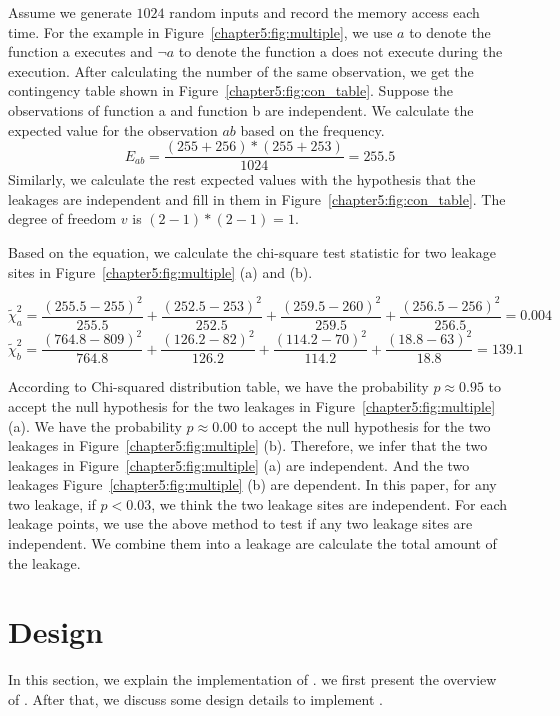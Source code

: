 Assume we generate $1024$ random inputs and record the memory access each time. For the example in Figure~\ref{chapter5:fig:multiple}, we use $a$ to denote the function \textsf{a} executes and $\lnot a$ to denote the function \textsf{a} does not execute during the execution. After calculating the number of the same observation, we get the contingency table shown in Figure~\ref{chapter5:fig:con_table}. Suppose the observations of function \textsf{a} and function \textsf{b} are independent. We calculate the expected value for the observation $ab$ based on the frequency.
\[ E_{ab} = \frac{(255+256)*(255+253)}{1024} = 255.5\]
Similarly, we calculate the rest expected values with the hypothesis that the leakages are independent and fill in them in Figure~\ref{chapter5:fig:con_table}. The degree of freedom $v$ is $(2-1)*(2-1) = 1$.

Based on the equation, we calculate the chi-square test statistic for two leakage sites in Figure~\ref{chapter5:fig:multiple} (a) and (b).

\[\tilde{\chi}^2_{a}= \frac{(255.5-255)^2}{255.5} + \frac{(252.5-253)^2}{252.5} + \frac{(259.5-260)^2}{259.5} + \frac{(256.5-256)^2}{256.5} = 0.004\] 
\[\tilde{\chi}^2_{b}= \frac{(764.8-809)^2}{764.8} + \frac{(126.2-82)^2}{126.2} + \frac{(114.2-70)^2}{114.2} + \frac{(18.8-63)^2}{18.8} = 139.1\] 

According to Chi-squared distribution table, we have the probability $p\approx0.95$ to accept the null hypothesis for the two leakages in Figure~\ref{chapter5:fig:multiple} (a). We have the probability $p\approx0.00$ to accept the null hypothesis for the two leakages in Figure~\ref{chapter5:fig:multiple} (b). Therefore, we infer that the two leakages in Figure~\ref{chapter5:fig:multiple} (a) are independent. And the two leakages Figure~\ref{chapter5:fig:multiple} (b) are dependent. In this paper, for any two leakage, if $p < 0.03$, we think the two leakage sites are independent. For each leakage points, we use the above method to test if any two leakage sites are independent. We combine them into a leakage are calculate the total amount of the leakage.
\section{Design}
In this section, we explain the implementation of \ctool{}.
we first present the overview of \ctool{}. After that, we discuss some design details to implement \ctool{}.

